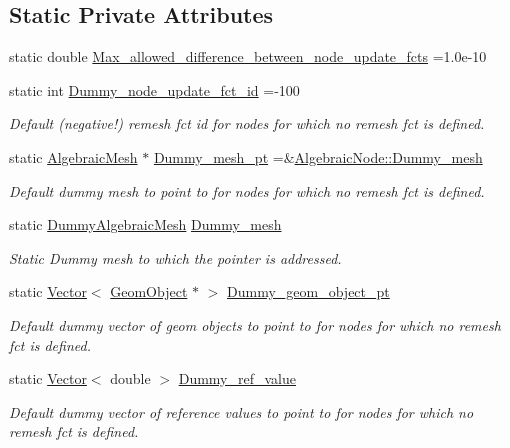 \subsection*{Static Private Attributes}
\begin{DoxyCompactItemize}
\item 
static double \hyperlink{classoomph_1_1AlgebraicNode_a5696d589c11a229f402d68476c7fe435}{Max\+\_\+allowed\+\_\+difference\+\_\+between\+\_\+node\+\_\+update\+\_\+fcts} =1.\+0e-\/10
\item 
static int \hyperlink{classoomph_1_1AlgebraicNode_af6d3b50db54114b5cf22f86c0ceed2f8}{Dummy\+\_\+node\+\_\+update\+\_\+fct\+\_\+id} =-\/100
\begin{DoxyCompactList}\small\item\em Default (negative!) remesh fct id for nodes for which no remesh fct is defined. \end{DoxyCompactList}\item 
static \hyperlink{classoomph_1_1AlgebraicMesh}{Algebraic\+Mesh} $\ast$ \hyperlink{classoomph_1_1AlgebraicNode_a21f78f61150e308456db352907aa26c6}{Dummy\+\_\+mesh\+\_\+pt} =\&\hyperlink{classoomph_1_1AlgebraicNode_aa89c19c1d7c5e5efd1b501098491bf5c}{Algebraic\+Node\+::\+Dummy\+\_\+mesh}
\begin{DoxyCompactList}\small\item\em Default dummy mesh to point to for nodes for which no remesh fct is defined. \end{DoxyCompactList}\item 
static \hyperlink{classoomph_1_1DummyAlgebraicMesh}{Dummy\+Algebraic\+Mesh} \hyperlink{classoomph_1_1AlgebraicNode_aa89c19c1d7c5e5efd1b501098491bf5c}{Dummy\+\_\+mesh}
\begin{DoxyCompactList}\small\item\em Static Dummy mesh to which the pointer is addressed. \end{DoxyCompactList}\item 
static \hyperlink{classoomph_1_1Vector}{Vector}$<$ \hyperlink{classoomph_1_1GeomObject}{Geom\+Object} $\ast$ $>$ \hyperlink{classoomph_1_1AlgebraicNode_a74bfe556a50b852ee06245e6a374d5fc}{Dummy\+\_\+geom\+\_\+object\+\_\+pt}
\begin{DoxyCompactList}\small\item\em Default dummy vector of geom objects to point to for nodes for which no remesh fct is defined. \end{DoxyCompactList}\item 
static \hyperlink{classoomph_1_1Vector}{Vector}$<$ double $>$ \hyperlink{classoomph_1_1AlgebraicNode_af73f0a803e1bdf2a7a1c7f1f4384df61}{Dummy\+\_\+ref\+\_\+value}
\begin{DoxyCompactList}\small\item\em Default dummy vector of reference values to point to for nodes for which no remesh fct is defined. \end{DoxyCompactList}\end{DoxyCompactItemize}
